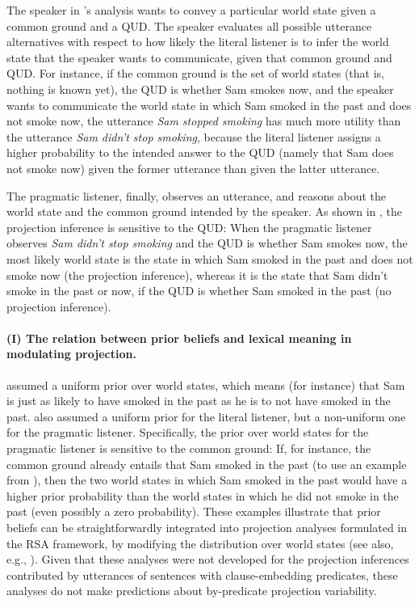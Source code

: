 \documentclass[11pt,fleqn]{article}
\newcommand{\6}{\mbox{$[\hspace*{-.6mm}[$}}
\newcommand{\9}{\mbox{$]\hspace*{-.6mm}]$}}
\newcommand{\citepos}[1]{\citeauthor{#1}'s \citeyear{#1}}
\begin{document}
The speaker in \citepos{qing-etal2016} analysis wants to convey a particular world state given a common ground and a QUD. The speaker evaluates all possible utterance alternatives with respect to how likely the literal listener is to infer the world state that the speaker wants to communicate, given that common ground and QUD. For instance, if the common ground is the set of world states (that is, nothing is known yet), the QUD is whether Sam smokes now, and the speaker wants to communicate the world state in which Sam smoked in the past and does not smoke now, the utterance {\em Sam stopped smoking} has much more utility than the utterance {\em Sam didn't stop smoking}, because the literal listener assigns a higher probability to the intended answer to the QUD (namely that Sam does not smoke now) given the former utterance than given the latter utterance. 

The pragmatic listener, finally, observes an utterance, and reasons about the world state and the common ground intended by the speaker. As shown in \citealt{qing-etal2016}, the projection inference is sensitive to the QUD: When the pragmatic listener observes {\em Sam didn't stop smoking} and the QUD is whether Sam smokes now, the most likely world state is the state in which Sam smoked in the past and does not smoke now (the projection inference), whereas it is the state that Sam didn't smoke in the past or now, if the QUD is whether Sam smoked in the past (no projection inference).

\paragraph{(I) The relation between prior beliefs and lexical meaning in modulating projection.}

\citealt{qing-etal2016} assumed a uniform prior over world states, which means (for instance) that Sam is just as likely to have smoked in the past as he is to not have smoked in the past. \citealt{warstadt2022} also assumed a uniform prior for the literal listener, but a non-uniform one for the pragmatic listener. Specifically, the prior over world states for the pragmatic listener is sensitive to the common ground: If, for instance, the common ground already entails that Sam smoked in the past (to use an example from \citealt{qing-etal2016}), then the two world states in which Sam smoked in the past would have a higher prior probability than the world states in which he did not smoke in the past (even possibly a zero probability). These examples illustrate that prior beliefs can be straightforwardly integrated into projection analyses formulated in the RSA framework, by modifying the distribution over world states (see also, e.g., \citealt{goodman-stuhlmueller2013,degen2023-RSA}). Given that these analyses were not developed for the projection inferences contributed by utterances of sentences with clause-embedding predicates, these analyses do not make predictions about by-predicate projection variability.
\end{document}
